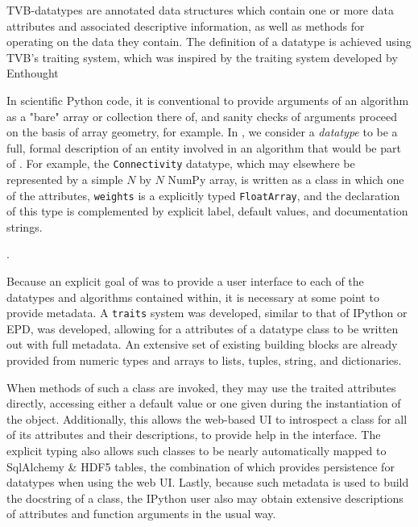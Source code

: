  TVB-datatypes are annotated data structures which
contain one or more data attributes and associated descriptive information, as
well as methods for operating on the data they contain. The definition of a
datatype is achieved using TVB's traiting system, which was inspired by the
traiting system developed by Enthought \cite{Enthought_2001} 



In scientific Python code, it is conventional to provide arguments
of an algorithm as a "bare" array or collection there of, and sanity
checks of arguments proceed on the basis of array geometry, for example.
In \TVB, we consider a \textit{datatype} to be a full, formal description of 
an entity involved in an algorithm that would be part of \TVB. 
For example, the \texttt{Connectivity} datatype, which may elsewhere
be represented by a simple $N$ by $N$ NumPy array, is written as a class
in which one of the attributes, \texttt{weights} is a explicitly typed 
\texttt{FloatArray}, and the declaration of this type is complemented by
explicit label, default values, and documentation strings. 

.

Because an explicit goal of \TVB was to provide a user interface to each of the
datatypes and algorithms contained within, it is necessary at some point to
provide metadata. A \texttt{traits} system was developed, similar to that of
IPython or EPD, was developed, allowing for a attributes of a datatype class to
be written out with full metadata. An extensive set of existing building 
blocks are already provided from numeric types and arrays to lists, tuples, 
string, and dictionaries.


 When methods of such a class are invoked,
they may use the traited attributes directly, accessing either a default value
or one given during the instantiation of the object. Additionally, this allows
the web-based UI to introspect a class for all of its attributes and their
descriptions, to provide help in the interface. The explicit typing also allows
such classes to be nearly automatically mapped to SqlAlchemy \& HDF5 tables,
the combination of which provides persistence for datatypes when using the web
UI.  Lastly, because such metadata is used to build the docstring of a class,
the IPython user also may obtain extensive descriptions of attributes and
function arguments in the usual way. 

